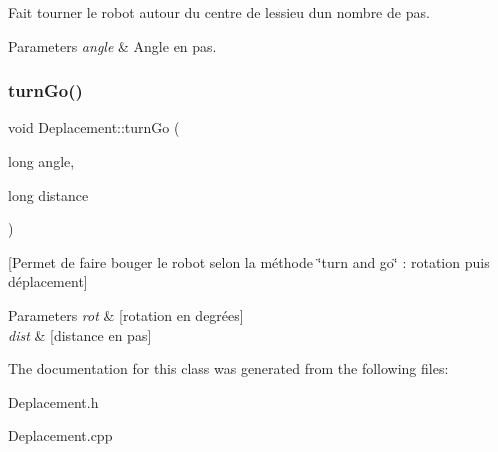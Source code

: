 Fait tourner le robot autour du centre de l\textquotesingle{}essieu d\textquotesingle{}un nombre de pas. 
\begin{DoxyParams}{Parameters}
{\em angle} & Angle en pas. \\
\hline
\end{DoxyParams}
\label{class_deplacement_a2551fc48792ae29f6521bd74d9322b61} 
\subsubsection{turn\+Go()}
{\footnotesize\ttfamily void Deplacement\+::turn\+Go (\begin{DoxyParamCaption}\item[{long}]{angle,  }\item[{long}]{distance }\end{DoxyParamCaption})}

[Permet de faire bouger le robot selon la méthode \char`\"{}turn and go\char`\"{} \+: rotation puis déplacement] 
\begin{DoxyParams}{Parameters}
{\em rot} & [rotation en degrées] \\
\hline
{\em dist} & [distance en pas] \\
\hline
\end{DoxyParams}


The documentation for this class was generated from the following files\+:\begin{DoxyCompactItemize}
\item 
Deplacement.\+h\item 
Deplacement.\+cpp\end{DoxyCompactItemize}
